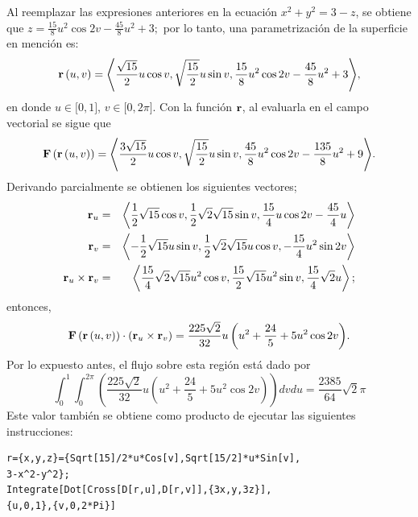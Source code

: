 \begin{parrafonumerado}
Al reemplazar las expresiones anteriores en la ecuación $x^2+y^2=3-z$, se obtiene que
$z=\frac{15}{8}u^{2}\cos 2v-\frac{45}{8}u^{2}+3;$
por lo tanto, una parametrización de la superficie en mención es:
\[{\bf r}\left( u,v\right) =\left\langle \frac{\sqrt{15}}{2}u\cos v,\sqrt{\frac{15}{2}}u\sin v,
\frac{15}{8}u^{2}\cos 2v-\frac{45}{8}u^{2}+3\right\rangle\!,\]
en donde $u\in \lbrack 0,1]$, $v\in \lbrack 0,2\pi ]$.
Con la función ${\bf r}$, al evaluarla en el campo vectorial se sigue que
\[{\bf F}\left({\bf r}\left( u,v\right) \right) =\left\langle \frac{3\sqrt{15}}{2}u\cos v,\sqrt{\frac{15}{2}}u\sin v,\frac{45}{8}u^{2}\cos 2v-\frac{135}{8}u^{2}+9\right\rangle\!.\]
Derivando parcialmente se obtienen los siguientes vectores;
\begin{eqnarray*}
{\bf r}_{u} &=&\left\langle \frac{1}{2}\sqrt{15}\cos v,\frac{1}{2}\sqrt{2}\sqrt{15}%
\sin v,\frac{15}{4}u\cos 2v-\frac{45}{4}u \right\rangle \\
{\bf r}_{v}&=& \left\langle -\frac{1}{2}\sqrt{15}u\sin v,\frac{1}{2}\sqrt{2}\sqrt{15}u\cos v,-\frac{15}{4}u^{2}\sin 2v \right\rangle \\
{\bf r}_{u}\times {\bf r}_{v}&=&\left\langle \frac{15}{4}\sqrt{2}\sqrt{15}u^{2}\cos v,\frac{15}{2}\sqrt{15}u^{2}\sin v,\frac{15}{4}\sqrt{2}u\right\rangle;
\end{eqnarray*}
entonces,
\[{\bf F}\left({\bf r}\left(u,v\right) \right) \cdot \left({\bf r}_{u}\times {\bf r}_{v}\right) =\frac{225\sqrt{2}}{32}u\left( u^{2}+\frac{24}{5}+5u^{2}\cos 2v\right)\!.\]
Por lo expuesto antes, el flujo sobre esta región está dado por
\begin{equation}\label{flujo5}
\int_{0}^{1}\int_{0}^{2\pi }\left( \frac{225\sqrt{2}}{32}u\left( u^{2}+ \frac{24}{5}+5u^{2}\cos 2v\right) \right) dvdu= \frac{2385}{64}\sqrt{2}\pi
\end{equation}
Este valor también se obtiene como producto de ejecutar las siguientes instrucciones:

\begin{tcolorbox}[title=\bf Instrucción \verb"Mathematica"]\begin{Verbatim}[formatcom=\letraverbatim]
r={x,y,z}={Sqrt[15]/2*u*Cos[v],Sqrt[15/2]*u*Sin[v],
3-x^2-y^2};
Integrate[Dot[Cross[D[r,u],D[r,v]],{3x,y,3z}],
{u,0,1},{v,0,2*Pi}]
\end{Verbatim}
\end{tcolorbox}


\end{parrafonumerado}
